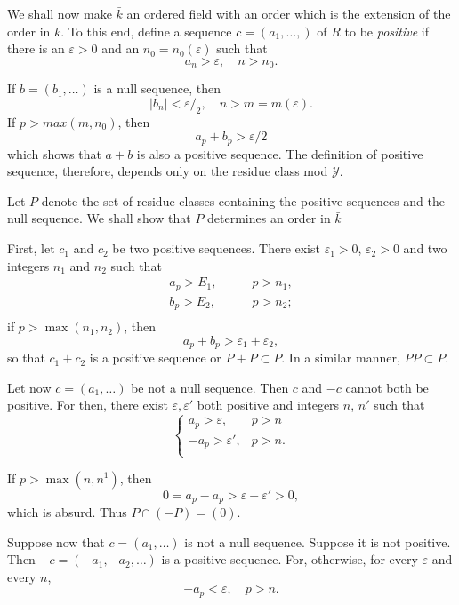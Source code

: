 We shall now make $ \bar{k} $ an ordered field with an order which is
the extension of the order in $k$. To this end, define a sequence $ c
= ( a_1, \ldots , ) $  of $R$ to be  \textit{positive} if there is an
$ \varepsilon > 0 $  and an $ n_0 = n_0 ( \varepsilon ) $ such that  
$$
a_n > \varepsilon ,  \quad n > n_0 .
$$

If  $ b = ( b_1 , \ldots ) $ is a null sequence, then  
$$
|b_n| < \varepsilon/_2  ,  \quad n > m = m ( \varepsilon ). 
$$
\noindent
If $ p > max ( m, n_0 ) $, then 
$$
a_p + b_p > \varepsilon / 2
$$
which shows that $ a + b $ is also a positive sequence. The definition
of positive sequence, therefore, depends only on the residue class mod
$ \mathscr{Y} $. 

Let $P$  denote  the set of residue classes  containing the  positive
sequences and the null sequence. We shall show that $P$ determines an
order in $ \bar{k} $ 

 First, let $c_1$ and  $c_2$ be two positive sequences. There exist $ 
 \varepsilon_1 > 0$,  $\varepsilon_2 > 0 $  and two integers  $n_1$ and
 $n_2$ such that  
  \begin{align*}
 a_p >  E_1 ,  & \qquad  p > n_1 , \\
 b_p >  E_2 ,  & \qquad  p > n_2 ;\\
 \end{align*} 
  if  $ p > \max ( n_1,n_2) $, then
 $$
 a_p + b_p > \varepsilon_1 + \varepsilon_2 ,
 $$\pageoriginale
so that $ c_1 + c_2 $ is a positive sequence or $ P + P \subset P
$. In a similar manner, $ P P \subset  P $. 

Let now   $ c = ( a_1 , \ldots ) $ be not a null sequence. Then $c$
and $-c$ cannot both be positive. For then, there exist $ \varepsilon,
\varepsilon' $ both positive and integers $n$, $n'$ such that  
\begin{equation*}
 \begin{cases}
a_p > \varepsilon ,&p > n \\
-a_p > \varepsilon' ,&p > n .\\
\end{cases}
\end{equation*}

If $ p > \max (n, n^{1}) $, then 
$$
0 = a_p -a_p > \varepsilon + \varepsilon' > 0,
$$
which is absurd. Thus $ P \cap  ( -P) = (0) $.

Suppose now that  $ c =( a_1 , \ldots ) $ is not a null
sequence. Suppose it is not positive. Then $ -c = ( -a_1, -a_2 ,
\ldots ) $ is a positive  sequence. For, otherwise, for every
$\varepsilon $ and every $n$, 
$$
-a_p  < \varepsilon , \quad  p>n .
$$

